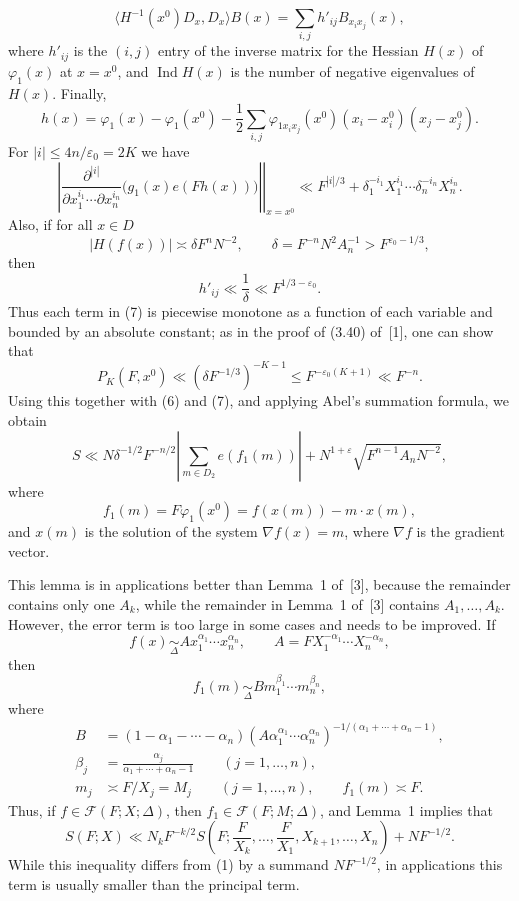 \documentclass[10pt]{article}
\begin{document}
\[
  \langle H^{-1}(x^0)D_x,D_x\rangle B(x)
  =\sum_{i,j}h'_{ij}B_{x_ix_j}(x),
\]
where $h'_{ij}$ is the $(i,j)$ entry of the inverse matrix for the Hessian $H(x)$ of $\varphi_1(x)$ at $x=x^0$, and $\operatorname{Ind}H(x)$ is the number of negative eigenvalues of $H(x)$. Finally,
\[
  h(x)=\varphi_1(x)-\varphi_1(x^0)
  -\frac12\sum_{i,j}\varphi_{1x_ix_j}(x^0)(x_i-x_i^0)(x_j-x_j^0).
\]
For $|i|\leqslant4n/\varepsilon_0=2K$ we have
\[
  \left.
  \left|\frac{\partial^{|i|}}
  {\partial x_1^{i_1}\cdots\partial x_n^{i_n}}
  \bigl(g_1(x)e(Fh(x))\bigr)\right|\right|_{x=x^0}
  \ll F^{|i|/3}+\delta_1^{-i_1}X_1^{i_1}\cdots\delta_n^{-i_n}X_n^{i_n}.
\]
Also, if for all $x\in D$
\[
  |H(f(x))|\asymp\delta F^nN^{-2},
  \qquad
  \delta=F^{-n}N^2A_n^{-1}>F^{\varepsilon_0-1/3},
\]
then
\[
  h'_{ij}\ll\frac1\delta\ll F^{1/3-\varepsilon_0}.
\]
Thus each term in (7) is piecewise monotone as a function of each variable and bounded by an absolute constant; as in the proof of (3.40) of~[1], one can show that
\[
  P_K(F,x^0)\ll(\delta F^{-1/3})^{-K-1}
  \leqslant F^{-\varepsilon_0(K+1)}\ll F^{-n}.
\]
Using this together with (6) and (7), and applying Abel's summation formula, we obtain
\[
  S\ll N\delta^{-1/2}F^{-n/2}
  \left|\sum_{m\in D_2}e(f_1(m))\right|
  +N^{1+\varepsilon}\sqrt{F^{n-1}A_nN^{-2}},
\]
where
\[
  f_1(m)=F\varphi_1(x^0)=f(x(m))-m\cdot x(m),
\]
and $x(m)$ is the solution of the system $\nabla f(x)=m$, where $\nabla f$ is the gradient vector.

This lemma is in applications better than Lemma~1 of~[3], because the remainder contains only one $A_k$, while the remainder in Lemma~1 of~[3] contains $A_1,\ldots,A_k$. However, the error term is too large in some cases and needs to be improved. If
\[
  f(x)\underset{\Delta}{\sim}Ax_1^{\alpha_1}\cdots x_n^{\alpha_n},
  \qquad
  A=FX_1^{-\alpha_1}\cdots X_n^{-\alpha_n},
\]
then
\[
  f_1(m)\underset{\Delta}{\sim}Bm_1^{\beta_1}\cdots m_n^{\beta_n},
\]
where
\[
\begin{aligned}
  B&=(1-\alpha_1-\cdots-\alpha_n)
  \left(A\alpha_1^{\alpha_1}\cdots\alpha_n^{\alpha_n}\right)^{-1/(\alpha_1+\cdots+\alpha_n-1)},\\
  \beta_j&=\frac{\alpha_j}{\alpha_1+\cdots+\alpha_n-1}\qquad(j=1,\ldots,n),\\
  m_j&\asymp F/X_j=M_j\qquad(j=1,\ldots,n),
  \qquad f_1(m)\asymp F.
\end{aligned}
\]
Thus, if $f\in\mathscr F(F;X;\Delta)$, then $f_1\in\mathscr F(F;M;\Delta)$, and Lemma~1 implies that
\[
  S(F;X)\ll N_kF^{-k/2}
  S\left(F;\frac F{X_k},\ldots,\frac F{X_1},X_{k+1},\ldots,X_n\right)
  +NF^{-1/2}.
\]
While this inequality differs from (1) by a summand $NF^{-1/2}$, in applications this term is usually smaller than the principal term.
\end{document}
